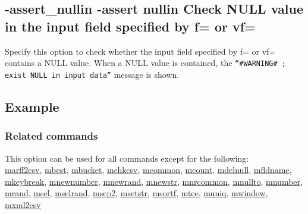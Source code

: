 

%

\subsection{-assert\_nullin -assert nullin Check NULL value in the input field specified by f= or vf= \label{sect:option_assert_nullin}}
Specify this option to check whether the input field specified by f= or vf= contains a NULL value. When a NULL value is contained, the \verb|“#WARNING# ; exist NULL in input data”| message is shown.

\subsection*{Example}


\subsubsection*{Related commands}
This option can be used for all commands except for the following: \\
\hyperref[sect:marff2csv]{marff2csv},
\hyperref[sect:mbest]{mbest},
\hyperref[sect:mbucket]{mbucket},
\hyperref[sect:mchkcsv]{mchkcsv},
\hyperref[sect:mcommon]{mcommon},
\hyperref[sect:mcount]{mcount},
\hyperref[sect:mdelnull]{mdelnull},
\hyperref[sect:mfldname]{mfldname},
\hyperref[sect:mkeybreak]{mkeybreak},
\hyperref[sect:mnewnumber]{mnewnumber},
\hyperref[sect:mnewrand]{mnewrand},
\hyperref[sect:mnewstr]{mnewstr},
\hyperref[sect:mnrcommon]{mnrcommon},
\hyperref[sect:mnullto]{mnullto},
\hyperref[sect:mnumber]{mnumber},
\hyperref[sect:mrand]{mrand},
\hyperref[sect:msel]{msel},
\hyperref[sect:mselrand]{mselrand},
\hyperref[sect:msep2]{msep2},
\hyperref[sect:msetstr]{msetstr},
\hyperref[sect:msortf]{msortf},
\hyperref[sect:mtee]{mtee},
\hyperref[sect:muniq]{muniq},
\hyperref[sect:mwindow]{mwindow},
\hyperref[sect:mxml2csv]{mxml2csv}\\

%

